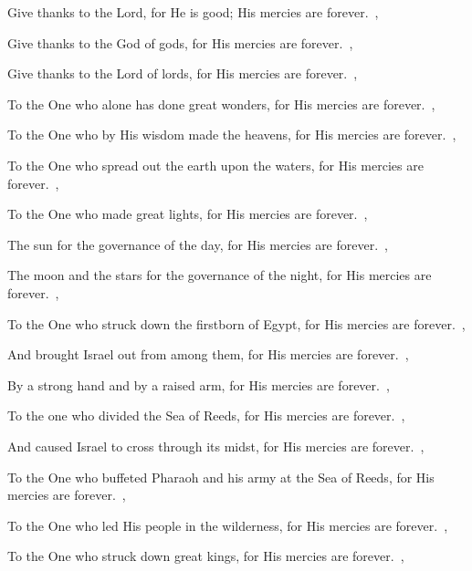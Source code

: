 \documentclass[12pt,twoside,a5paper]{article}
\begin{document}



\begin{normalparskip}
  Give thanks to the Lord, for He is good; His mercies are forever.~\sep

  Give thanks to the God of gods, for His mercies are forever.~\sep


  Give thanks to the Lord of lords, for His mercies are forever.~\sep

  To the One who alone has done great wonders, for His mercies are forever.~\sep

  To the One who by His wisdom made the heavens, for His mercies are forever.~\sep

  To the One who spread out the earth upon the waters, for His mercies are forever.~\sep

  To the One who made great lights, for His mercies are forever.~\sep

  The sun for the governance of the day, for His mercies are forever.~\sep

  The moon and the stars for the governance of the night, for His mercies are forever.~\sep

  To the One who struck down the firstborn of Egypt, for His mercies are forever.~\sep

  And brought Israel out from among them, for His mercies are forever.~\sep

  By a strong hand and by a raised arm, for His mercies are forever.~\sep

  To the one who divided the Sea of Reeds, for His mercies are forever.~\sep

  And caused Israel to cross through its midst, for His mercies are forever.~\sep

  To the One who buffeted Pharaoh and his army at the Sea of Reeds, for His mercies are forever.~\sep

  To the One who led His people in the wilderness, for His mercies are forever.~\sep

  To the One who struck down great kings, for His mercies are forever.~\sep


\end{normalparskip}
\end{document}
